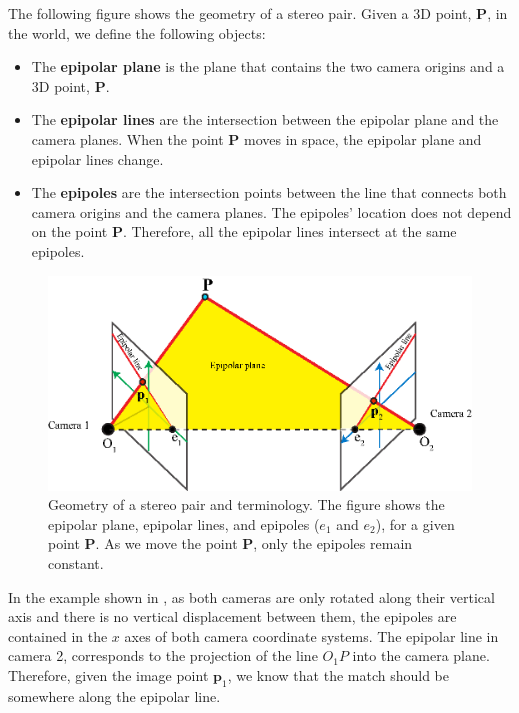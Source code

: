 
The following figure shows the geometry of a stereo pair. Given a 3D point, $\mathbf{P}$, in the world, we define the following objects:
\begin{itemize}
    \item The {\bf epipolar plane} is the plane that contains the two camera origins and a 3D point, $\mathbf{P}$.

    \item The {\bf epipolar lines} are the intersection between the epipolar plane and the camera planes. When the point $\mathbf{P}$ moves in space, the epipolar plane and epipolar lines change.

    \item The {\bf epipoles} are the intersection points between the line that connects both camera origins and the camera planes.  The epipoles' location does not depend on the point $\mathbf{P}$. Therefore, all the epipolar lines intersect at the same epipoles.
\end{itemize}

\begin{figure}[h!]
    \centerline{
        \includegraphics[width=0.8\linewidth]{figures/3d_scene_understanding/epipolar_geometry.eps}
    }
    \caption{Geometry of a stereo pair and terminology. The figure shows the epipolar plane, epipolar lines, and epipoles ($e_1$ and $e_2$), for a given point $\mathbf{P}$. As we move the point $\mathbf{P}$, only the epipoles remain constant.}
    \label{fig:epipolar_geometry_terminology}
\end{figure}

In the example shown in \fig{\ref{fig:epipolar_geometry_terminology}}, as both cameras are only rotated along their vertical axis and there is no vertical displacement between them, the epipoles are contained in the $x$ axes of both camera coordinate systems.
The epipolar line in camera 2, corresponds to the projection of the line $O_1 P$ into the camera plane. Therefore, given the image point $\mathbf{p}_1$, we know that the match should be somewhere along the epipolar line.

